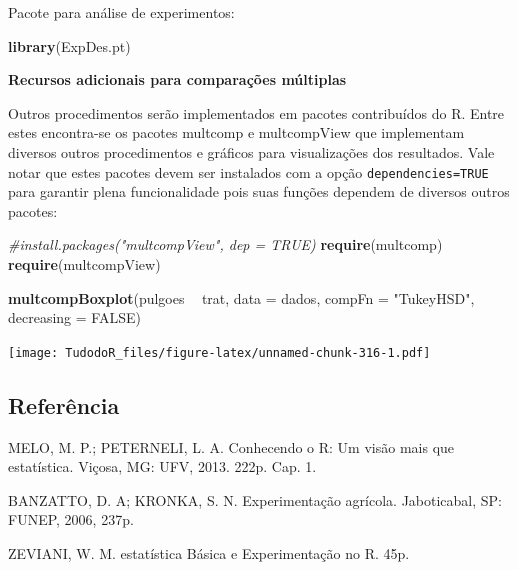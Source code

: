 \documentclass[
]{book}
\newenvironment{Shaded}{\begin{snugshade}}{\end{snugshade}}
\newcommand{\CommentTok}[1]{\textcolor[rgb]{0.56,0.35,0.01}{\textit{#1}}}
\newcommand{\DataTypeTok}[1]{\textcolor[rgb]{0.13,0.29,0.53}{#1}}
\newcommand{\KeywordTok}[1]{\textcolor[rgb]{0.13,0.29,0.53}{\textbf{#1}}}
\newcommand{\NormalTok}[1]{#1}
\newcommand{\OperatorTok}[1]{\textcolor[rgb]{0.81,0.36,0.00}{\textbf{#1}}}
\newcommand{\OtherTok}[1]{\textcolor[rgb]{0.56,0.35,0.01}{#1}}
\newcommand{\StringTok}[1]{\textcolor[rgb]{0.31,0.60,0.02}{#1}}
\begin{document}
Pacote para análise de experimentos:

\begin{Shaded}
\begin{Highlighting}[]
\KeywordTok{library}\NormalTok{(ExpDes.pt)}
\end{Highlighting}
\end{Shaded}

\textbf{Recursos adicionais para comparações múltiplas}

Outros procedimentos serão implementados em pacotes contribuídos do R. Entre estes encontra-se os pacotes multcomp e multcompView que implementam diversos outros procedimentos e gráficos para visualizações dos resultados. Vale notar que estes pacotes devem ser instalados com a opção \texttt{dependencies=TRUE} para garantir plena funcionalidade pois suas funções dependem de diversos outros pacotes:

\begin{Shaded}
\begin{Highlighting}[]
\CommentTok{#install.packages("multcompView", dep = TRUE) }
\KeywordTok{require}\NormalTok{(multcomp) }
\KeywordTok{require}\NormalTok{(multcompView)}
\end{Highlighting}
\end{Shaded}

\begin{Shaded}
\begin{Highlighting}[]
\KeywordTok{multcompBoxplot}\NormalTok{(pulgoes }\OperatorTok{~}\StringTok{ }\NormalTok{trat, }\DataTypeTok{data =}\NormalTok{ dados, }\DataTypeTok{compFn =} \StringTok{"TukeyHSD"}\NormalTok{, }\DataTypeTok{decreasing =} \OtherTok{FALSE}\NormalTok{)}
\end{Highlighting}
\end{Shaded}

\texttt{[image: TudodoR\_files/figure-latex/unnamed-chunk-316-1.pdf]}

\hypertarget{referuxeancia-4}{%
\subsection{Referência}\label{referuxeancia-4}}

MELO, M. P.; PETERNELI, L. A. Conhecendo o R: Um visão mais que estatística. Viçosa, MG: UFV, 2013. 222p. Cap. 1.

BANZATTO, D. A; KRONKA, S. N. Experimentação agrícola. Jaboticabal, SP: FUNEP, 2006, 237p.

ZEVIANI, W. M. estatística Básica e Experimentação no R. 45p.
\end{document}
